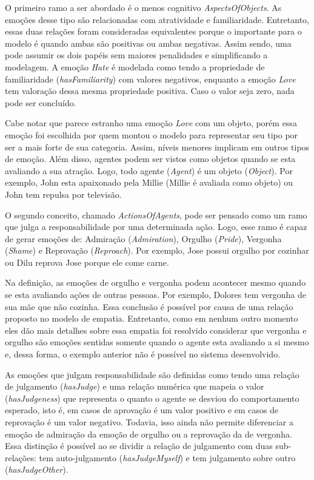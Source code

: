 O primeiro ramo a ser abordado é o menos cognitivo \emph{AspectsOfObjects}.
As emoções desse tipo são relacionadas com atratividade e familiaridade.
Entretanto, essas duas relações foram consideradas equivalentes porque o
importante para o modelo é quando ambas são positivas ou ambas negativas.
Assim sendo, uma pode assumir os dois papéis sem maiores penalidades e
simplificando a modelagem. A emoção \emph{Hate} é modelada como tendo a
propriedade de familiaridade (\emph{hasFamiliarity}) com valores negativos,
enquanto a emoção \emph{Love} tem valoração dessa mesma propriedade positiva.
Caso o valor seja zero, nada pode ser concluído.

Cabe notar que parece estranho uma emoção \emph{Love} com um objeto, porém
essa emoção foi escolhida por quem montou o modelo para representar seu tipo
por ser a mais forte de sua categoria. Assim, níveis menores implicam em
outros tipos de emoção. Além disso, agentes
podem ser vistos como objetos quando se esta avaliando a sua atração. Logo,
todo agente (\emph{Agent}) é um objeto (\emph{Object}). Por exemplo, John esta
apaixonado pela Millie (Millie é avaliada como objeto) ou John tem
repulsa por televisão.

O segundo conceito, chamado \emph{ActionsOfAgents}, pode ser pensado como
um ramo que julga a responsabilidade por uma determinada ação.
Logo, esse ramo é capaz de gerar emoções de: Admiração (\emph{Admiration}),
Orgulho (\emph{Pride}), Vergonha (\emph{Shame}) e Reprovação
(\emph{Reproach}). Por exemplo, Jose possui orgulho por cozinhar ou Dilu
reprova Jose porque ele come carne.

Na definição, as emoções de orgulho e vergonha podem acontecer mesmo quando se
esta avaliando ações de outras pessoas. Por exemplo, Dolores tem vergonha de
sua mãe que não cozinha. Essa conclusão é possível por causa de uma relação
proposto no modelo \occ de empatia\label{mark:empat}. Entretanto, como em nenhum outro momento eles
dão mais detalhes sobre essa empatia foi resolvido considerar que vergonha e
orgulho são emoções sentidas somente quando o agente esta avaliando a si mesmo
e, dessa forma, o exemplo anterior não é possível no sistema desenvolvido. \dev{}

As emoções que julgam responsabilidade são definidas como tendo uma relação de
julgamento (\emph{hasJudge}) e uma relação numérica que mapeia o valor
(\emph{hasJudgeness}) que representa o quanto o agente se desviou do
comportamento esperado, isto é, em casos de aprovação é um valor positivo e em
casos de reprovação é um valor negativo. Todavia, isso ainda não permite
diferenciar a emoção de admiração da emoção de orgulho ou a reprovação da de
vergonha. Essa distinção é possível ao se dividir a relação de julgamento com
duas sub-relações: tem auto-julgamento (\emph{hasJudgeMyself}) e tem
julgamento sobre outro (\emph{hasJudgeOther}).

